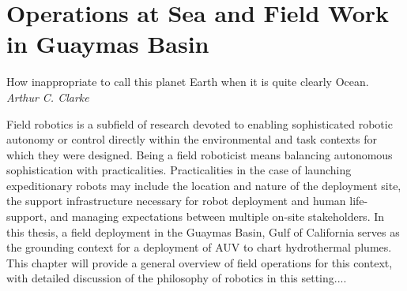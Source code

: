 \chapter{Operations at Sea and Field Work in Guaymas Basin}
\label{chap:opsatsea}

\begin{center}
    \begin{minipage}{0.6\textwidth}
      \begin{small}
        How inappropriate to call this planet Earth when it is quite clearly Ocean.\\ \emph{Arthur C. Clarke}
      \end{small}
    \end{minipage}
    \vspace{0.5cm}
\end{center}

Field robotics is a subfield of research devoted to enabling sophisticated robotic autonomy or control directly within the environmental and task contexts for which they were designed.
Being a field roboticist means balancing autonomous sophistication with practicalities.
Practicalities in the case of launching expeditionary robots may include the location and nature of the deployment site, the support infrastructure necessary for robot deployment and human life-support, and managing expectations between multiple on-site stakeholders.
In this thesis, a field deployment in the Guaymas Basin, Gulf of California serves as the grounding context for a deployment of AUV \Sentry to chart hydrothermal plumes.
This chapter will provide a general overview of field operations for this context, with detailed discussion of the philosophy of robotics in this setting....

